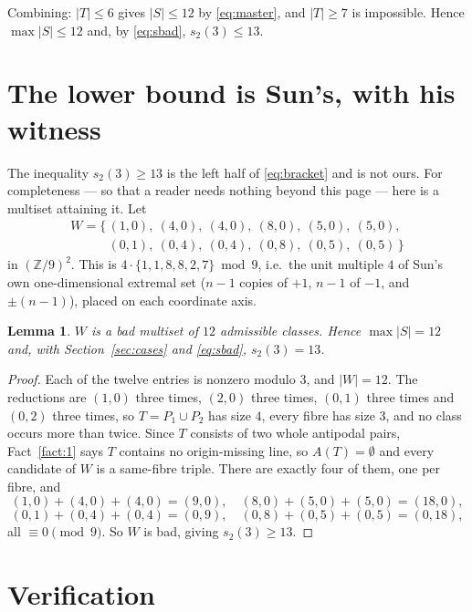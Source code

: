 \documentclass[11pt]{amsart}
\newtheorem{lemma}[theorem]{Lemma}
\newcommand{\ZZ}{\mathbb Z}
\begin{document}
Combining: $|T|\le6$ gives $|S|\le12$ by \eqref{eq:master}, and $|T|\ge7$ is
impossible. Hence $\max|S|\le12$ and, by \eqref{eq:sbad}, $s_2(3)\le13$.

\section{The lower bound is Sun's, with his witness}\label{sec:lower}

The inequality $s_2(3)\ge13$ is the left half of \eqref{eq:bracket} and is not
ours. For completeness --- so that a reader needs nothing beyond this page ---
here is a multiset attaining it. Let
\begin{equation}\label{eq:W}
\begin{gathered}
  W=\{\,(1,0),\ (4,0),\ (4,0),\ (8,0),\ (5,0),\ (5,0),\\
  \phantom{W=\{\,}(0,1),\ (0,4),\ (0,4),\ (0,8),\ (0,5),\ (0,5)\,\}
\end{gathered}
\end{equation}
in $(\ZZ/9)^2$. This is $4\cdot\{1,1,8,8,2,7\}\bmod 9$, i.e.\ the unit multiple
$4$ of Sun's own one-dimensional extremal set ($n-1$ copies of $+1$, $n-1$ of
$-1$, and $\pm(n-1)$), placed on each coordinate axis.

\begin{lemma}
$W$ is a bad multiset of $12$ admissible classes. Hence $\max|S|=12$ and, with
Section~\ref{sec:cases} and \eqref{eq:sbad}, $s_2(3)=13$.
\end{lemma}

\begin{proof}
Each of the twelve entries is nonzero modulo $3$, and $|W|=12$. The reductions
are $(1,0)$ three times, $(2,0)$ three times, $(0,1)$ three times and $(0,2)$
three times, so $T=P_1\cup P_2$ has size $4$, every fibre has size $3$, and no
class occurs more than twice. Since $T$ consists of two whole antipodal pairs,
Fact~\ref{fact:1} says $T$ contains no origin-missing line, so $A(T)=\emptyset$
and every candidate of $W$ is a same-fibre triple. There are exactly four of
them, one per fibre, and
\[
  (1,0)+(4,0)+(4,0)=(9,0),\quad (8,0)+(5,0)+(5,0)=(18,0),
\]
\[
  (0,1)+(0,4)+(0,4)=(0,9),\quad (0,8)+(0,5)+(0,5)=(0,18),
\]
all $\equiv0\pmod9$. So $W$ is bad, giving $s_2(3)\ge13$.
\end{proof}

\section{Verification}\label{sec:verify}
\end{document}
